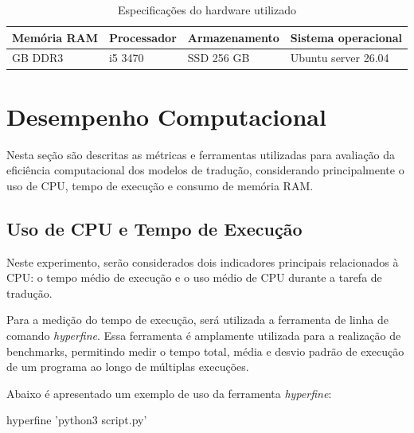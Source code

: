 \begin{table}[H]
\centering
\begin{tabular}{ |p{3cm}|p{3cm}|p{3cm}|p{3cm}| }
\hline
\multicolumn{1}{|p{3cm}|}{\centering\textbf{Memória RAM}} & \multicolumn{1}{p{3cm}|}{\centering\textbf{Processador}} & \multicolumn{1}{p{3cm}|}{\centering\textbf{Armazenamento}} & \multicolumn{1}{p{3cm}|}{\centering\textbf{Sistema operacional}} \\
\hline
\multicolumn{1}{|p{3cm}|}{\centering 16 GB DDR3} & \multicolumn{1}{p{3cm}|}{\centering i5 3470} & \multicolumn{1}{p{3cm}|}{\centering SSD 256 GB} & \multicolumn{1}{p{3cm}|}{\centering Ubuntu server 26.04} \\
\hline
\end{tabular}
\caption{Especificações do hardware utilizado}
\label{tab:ambiente_computacional}
\end{table}

\section{Desempenho Computacional}

Nesta seção são descritas as métricas e ferramentas utilizadas para avaliação da eficiência computacional dos modelos de tradução, considerando principalmente o uso de CPU, tempo de execução e consumo de memória RAM.

\subsection{Uso de CPU e Tempo de Execução}

Neste experimento, serão considerados dois indicadores principais relacionados à CPU: o tempo médio de execução e o uso médio de CPU durante a tarefa de tradução.

Para a medição do tempo de execução, será utilizada a ferramenta de linha de comando \textit{hyperfine}. Essa ferramenta é amplamente utilizada para a realização de benchmarks, permitindo medir o tempo total, média e desvio padrão de execução de um programa ao longo de múltiplas execuções.

Abaixo é apresentado um exemplo de uso da ferramenta \textit{hyperfine}:

\begin{listing}
\begin{python}
hyperfine 'python3 script.py'
\end{python}
\caption{Exemplo de uso da ferramenta \textit{hyperfine}}
\label{code:hyperfine}
\end{listing}

